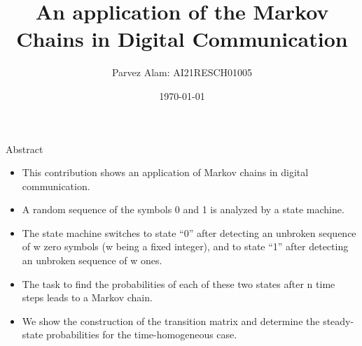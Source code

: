 \documentclass{beamer}
\title{An application of the Markov Chains in Digital Communication}
\author{Parvez Alam: AI21RESCH01005}
\institute{Indian Institute of Technology \\ Hyderabad}
\date{\today}
\begin{document}
\begin{frame}
\titlepage    
\end{frame}

\begin{frame}
\begin{block}{Abstract}
\begin{itemize}
    \item This contribution shows an application of Markov chains in digital communication.
    \item A random sequence of the symbols 0 and 1 is analyzed by a state machine.
    \item The state machine switches to state “0” after detecting an unbroken sequence of w zero symbols (w being a fixed integer), and to state “1” after detecting an unbroken sequence of w ones.
    \item The task to find the probabilities of each of these two states after n time steps leads to a Markov chain.
    \item We show the construction of the transition matrix and determine the steady-state probabilities for the time-homogeneous case.
\end {itemize}
    
\end{block}
    
\end{frame}
\end{document}
